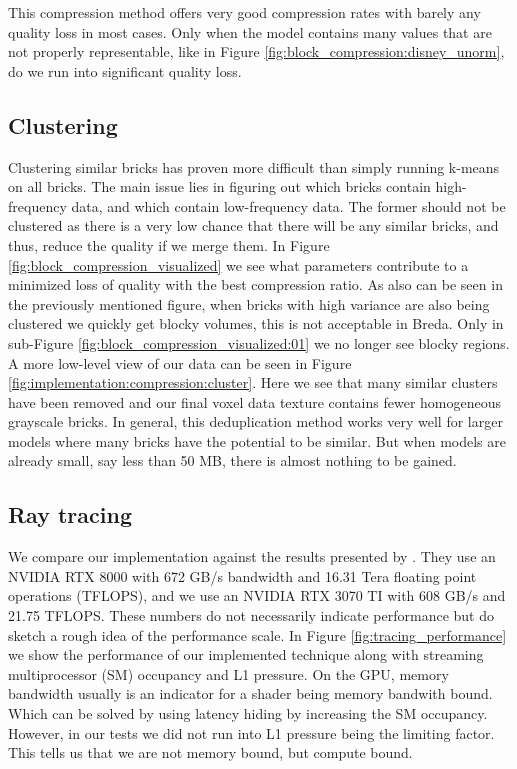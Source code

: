 This compression method offers very good compression rates with barely any quality loss in most cases. Only when the model contains many values that are not properly representable, like in Figure \ref{fig:block_compression:disney_unorm}, do we run into significant quality loss.

\subsection{Clustering} \label{results:clustering}
Clustering similar bricks has proven more difficult than simply running k-means on all bricks. The main issue lies in figuring out which bricks contain high-frequency data, and which contain low-frequency data. The former should not be clustered as there is a very low chance that there will be any similar bricks, and thus, reduce the quality if we merge them. In Figure \ref{fig:block_compression_visualized} we see what parameters contribute to a minimized loss of quality with the best compression ratio. As also can be seen in the previously mentioned figure, when bricks with high variance are also being clustered we quickly get blocky volumes, this is not acceptable in Breda. Only in sub-Figure \ref{fig:block_compression_visualized:01} we no longer see blocky regions. A more low-level view of our data can be seen in Figure \ref{fig:implementation:compression:cluster}. Here we see that many similar clusters have been removed and our final voxel data texture contains fewer homogeneous grayscale bricks.  In general, this deduplication method works very well for larger models where many bricks have the potential to be similar. But when models are already small, say less than 50 MB, there is almost nothing to be gained.

\subsection{Ray tracing} \label{results:ray_tracing}
We compare our implementation against the results presented by \cite{NanoVDBBenchmark}. They use an NVIDIA RTX 8000 with 672 GB/s bandwidth and 16.31 Tera floating point operations (TFLOPS), and we use an NVIDIA RTX 3070 TI with 608 GB/s and 21.75 TFLOPS. These numbers do not necessarily indicate performance but do sketch a rough idea of the performance scale. In Figure \ref{fig:tracing_performance} we show the performance of our implemented technique along with streaming multiprocessor (SM) occupancy and L1 pressure. On the GPU, memory bandwidth usually is an indicator for a shader being memory bandwith bound. Which can be solved by using latency hiding by increasing the SM occupancy. However, in our tests we did not run into L1 pressure being the limiting factor. This tells us that we are not memory bound, but compute bound.

